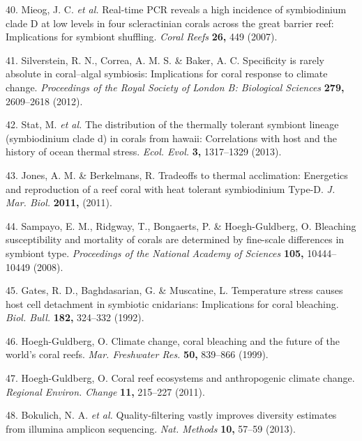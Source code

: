 \documentclass[]{article}
\begin{document}
\hypertarget{ref-Mieog2007-yy}{}
40. Mieog, J. C. \emph{et al.} Real-time PCR reveals a high incidence of
symbiodinium clade D at low levels in four scleractinian corals across
the great barrier reef: Implications for symbiont shuffling. \emph{Coral
Reefs} \textbf{26,} 449 (2007).

\hypertarget{ref-Silverstein2012-tm}{}
41. Silverstein, R. N., Correa, A. M. S. \& Baker, A. C. Specificity is
rarely absolute in coral--algal symbiosis: Implications for coral
response to climate change. \emph{Proceedings of the Royal Society of
London B: Biological Sciences} \textbf{279,} 2609--2618 (2012).

\hypertarget{ref-Stat2013-qp}{}
42. Stat, M. \emph{et al.} The distribution of the thermally tolerant
symbiont lineage (symbiodinium clade d) in corals from hawaii:
Correlations with host and the history of ocean thermal stress.
\emph{Ecol. Evol.} \textbf{3,} 1317--1329 (2013).

\hypertarget{ref-Jones2011-nf}{}
43. Jones, A. M. \& Berkelmans, R. Tradeoffs to thermal acclimation:
Energetics and reproduction of a reef coral with heat tolerant
symbiodinium Type-D. \emph{J. Mar. Biol.} \textbf{2011,} (2011).

\hypertarget{ref-Sampayo2008-tw}{}
44. Sampayo, E. M., Ridgway, T., Bongaerts, P. \& Hoegh-Guldberg, O.
Bleaching susceptibility and mortality of corals are determined by
fine-scale differences in symbiont type. \emph{Proceedings of the
National Academy of Sciences} \textbf{105,} 10444--10449 (2008).

\hypertarget{ref-Gates1992-ew}{}
45. Gates, R. D., Baghdasarian, G. \& Muscatine, L. Temperature stress
causes host cell detachment in symbiotic cnidarians: Implications for
coral bleaching. \emph{Biol. Bull.} \textbf{182,} 324--332 (1992).

\hypertarget{ref-Hoegh-Guldberg1999-rb}{}
46. Hoegh-Guldberg, O. Climate change, coral bleaching and the future of
the world's coral reefs. \emph{Mar. Freshwater Res.} \textbf{50,}
839--866 (1999).

\hypertarget{ref-Hoegh-Guldberg2011-sl}{}
47. Hoegh-Guldberg, O. Coral reef ecosystems and anthropogenic climate
change. \emph{Regional Environ. Change} \textbf{11,} 215--227 (2011).

\hypertarget{ref-Bokulich2013-cm}{}
48. Bokulich, N. A. \emph{et al.} Quality-filtering vastly improves
diversity estimates from illumina amplicon sequencing. \emph{Nat.
Methods} \textbf{10,} 57--59 (2013).
\end{document}
